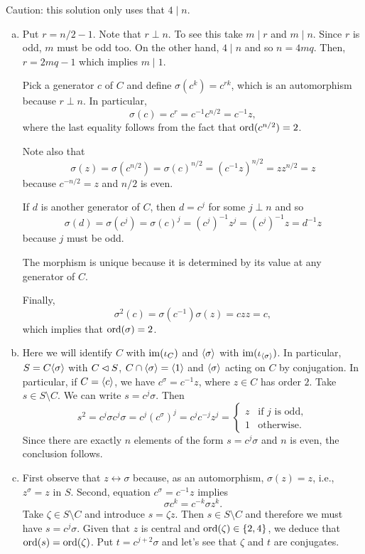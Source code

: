\begin{solution} Caution: this solution only uses that $4\mid n$.
\begin{enumerate}[a),font=\upshape]
    \item Put $r = n/2 - 1$. Note that $r\perp n$. To see this take $m\mid r$ and $m\mid n$. Since $r$ is odd, $m$ must be odd too. On the other hand, $4\mid n$ and so $n=4mq$. Then, $r=2mq-1$ which implies $m\mid1$.

    Pick a generator $c$ of $C$ and define $\sigma(c^k)=c^{rk}$, which is an automorphism because $r\perp n$. In particular,
    $$
        \sigma(c)=c^r = c^{-1}c^{n/2} = c^{-1}z,
    $$
    where the last equality follows from the fact that ${\rm ord}(c^{n/2})=2$.

    Note also that
    $$
        \sigma(z)=\sigma(c^{n/2})=\sigma(c)^{n/2}=(c^{-1}z)^{n/2}=zz^{n/2}=z
    $$
    because $c^{-n/2}=z$ and $n/2$ is even.

    If $d$ is another generator of $C$, then $d=c^j$ for some $j\perp n$ and so
    $$
        \sigma(d) = \sigma(c^j)=\sigma(c)^j=(c^j)^{-1}z^j=(c^j)^{-1}z=d^{-1}z
    $$
    because $j$ must be odd.
    
    The morphism is unique because it is determined by its value at any generator of $C$.

    Finally,
    $$
        \sigma^2(c) = \sigma(c^{-1})\sigma(z) = czz = c,
    $$
    which implies that ${\rm ord}(\sigma)=2$.
    
    \item Here we will identify $C$ with $\operatorname{im}(\iota_C)$ and $\langle\sigma\rangle$ with $\operatorname{im}(\iota_{\langle\sigma\rangle})$. In particular, $S=C\langle\sigma\rangle$ with $C\lhd S$, $C\cap\langle\sigma\rangle=\langle1\rangle$ and $\langle\sigma\rangle$ acting on $C$ by conjugation. In particular, if $C=\langle c\rangle$, we have $c^\sigma=c^{-1}z$, where $z\in C$ has order $2$. Take $s\in S\setminus C$. We can write $s=c^j\sigma$. Then
    $$
        s^2 = c^j\sigma c^j\sigma = c^j(c^\sigma)^j= c^jc^{-j}z^j
            = \begin{cases}
                z &\text{if $j$ is odd},\\
                1  &\text{otherwise}.
            \end{cases}
    $$
    Since there are exactly $n$ elements of the form $s=c^j\sigma$ and $n$ is even, the conclusion follows.

    \item First observe that $z\leftrightarrow\sigma$ because, as an automorphism, $\sigma(z)=z$, i.e., $z^\sigma=z$ in $S$. Second,  equation $c^\sigma=c^{-1}z$ implies
    $$
        \sigma c^k=c^{-k}\sigma z^k.
    $$
    Take $\zeta\in S\setminus C$ and introduce $s=\zeta z$. Then $s\in S\setminus C$ and therefore we must have $s=c^j\sigma$. Given that $z$ is central and ${\rm ord}(\zeta)\in\{2,4\}$, we deduce that ${\rm ord}(s)={\rm ord}(\zeta)$. Put $t=c^{j+2}\sigma$ and let's see that $\zeta$ and $t$ are conjugates.


\end{enumerate}
\end{solution}
